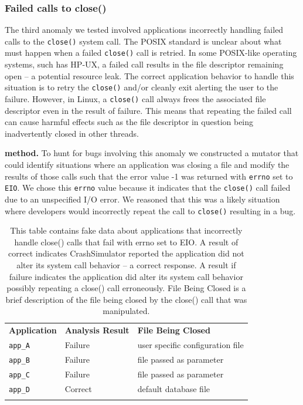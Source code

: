 \subsubsection{Failed calls to close()}
\label{sec-close-failed}

The third anomaly we tested involved applications incorrectly handling
failed calls to the {\tt close()} system call.  The POSIX standard is
unclear about what must happen when a failed {\tt close()} call is
retried.  In some POSIX-like operating systems, such has
HP-UX, a failed call results in the file descriptor remaining open -- a
potential resource leak.  The correct application behavior to handle this
situation is to retry the {\tt close()} and/or cleanly exit alerting the
user to the failure.  However, in Linux, a {\tt close()} call always frees
the associated file descriptor even in the result of failure.  This means
that repeating the failed call can cause harmful effects such as the file
descriptor in question being inadvertently closed in other
threads.

{\bf method.}  To hunt for bugs involving this anomaly we constructed a
mutator that could identify situations where an application was closing a
file and modify the results of those calls such that the error value -1 was
returned with {\tt errno} set to {\tt EIO}.  We chose this {\tt errno}
value because it indicates that the {\tt close()} call failed due to an
unspecified I/O error.  We
reasoned that this was a likely situation where developers would
incorrectly repeat the call to {\tt close()} resulting in a bug.

\begin{table}[t]
  \scriptsize{}
  \begin{tabular}{l | l | l}
    \toprule{}
      {\bf Application} & {\bf Analysis Result} & {\bf File Being Closed}\\
      {\tt app\_A} & Failure & user specific configuration file\\
      {\tt app\_B} & Failure & file passed as parameter \\
      {\tt app\_C} & Failure & file passed as parameter \\
      {\tt app\_D} & Correct &  default database file\\
    \bottomrule{}
  \end{tabular}
    \caption{This table contains fake data about applications that
    incorrectly handle close() calls that fail with errno set to EIO.  A
    result of correct indicates CrashSimulator reported  the application
    did not alter its system call behavior -- a correct response.  A result
    if failure indicates the application did alter its system call behavior
    possibly repeating a close() call erroneously.  File Being Closed is a
    brief description of the file being closed by the close() call that was
    manipulated.}
  \label{table:failedclose}
\end{table}

